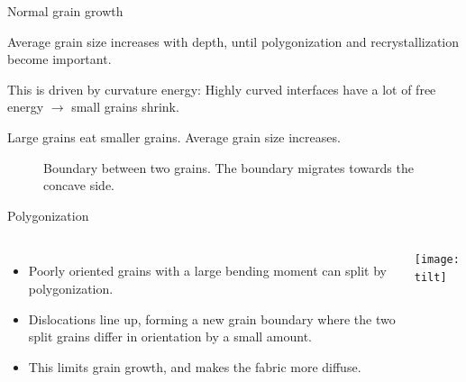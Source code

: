 \documentclass{beamer}
\begin{document}
\begin{frame}{Normal grain growth}
   \begin{itemize} \small{
      \item Average grain size increases with depth, until polygonization and recrystallization become important.
      \item This is driven by curvature energy: Highly curved interfaces have a lot of free energy $\rightarrow$ small grains shrink.
      \item Large grains eat smaller grains. Average grain size increases.
      }
   \end{itemize}


   \begin{figure}
\caption{\small{Boundary between two grains. The boundary migrates towards the concave side.}}
\end{figure}
\end{frame}


\begin{frame}{Polygonization}
\begin{columns}[T]
   \begin{itemize}
      \item Poorly oriented grains with a large bending moment can split by polygonization. 
      \item Dislocations line up, forming a new grain boundary where the two split grains differ in orientation by a small amount.
      \item This limits grain growth, and makes the fabric more diffuse.
   \end{itemize}
   \texttt{[image: tilt]}
\end{columns}
\end{frame}
\end{document}
